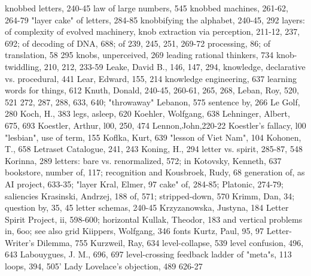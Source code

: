knobbed letters, 240-45                         law of large numbers, 545
knobbed machines, 261-62, 264-79                "layer cake" of letters, 284-85
knobbifying the alphabet, 240-45, 292           layers: of complexity of evolved machinery,
knob extraction via perception, 211-12, 237,      692; of decoding of DNA, 688; of
 239, 245, 251, 269-72                            processing, 86; of translation, 58        295
knobs, unperceived, 269                         leading rational thinkers, 734
knob-twiddling, 210, 212, 233-59                Leake, David B., 146, 147, 294,
knowledge, declarative vs. procedural, 441      Lear, Edward, 155, 214
knowledge engineering, 637                      learning words for things, 612
Knuth, Donald, 240-45, 260-61, 265, 268,        Leban, Roy, 520, 521
 272, 287, 288, 633, 640; "throwaway"           Lebanon, 575
 sentence by, 266                               Le Golf, 280
Koch, H., 383                                   legs, asleep, 620
Koehler, Wolfgang, 638                          Lehninger, Albert, 675, 693
Koestler, Arthur, l00, 250, 474                 Lennon,John,220-22
Koestler's fallacy, l00                         "lesbian", use of term, 155
Koflka, Kurt, 639                               "lesson of Viet Nam", 104
Kohonen, T., 658                                Letraset Catalogue, 241, 243
Koning, H., 294                                 letter vs. spirit, 285-87, 548
Korinna, 289                                    letters: bare vs. renormalized, 572; in
Kotovsky, Kenneth, 637                            bookstore, number of, 117; recognition and
Kousbroek, Rudy, 68                               generation of, as AI project, 633-35; "layer
Kral, Elmer, 97                                   cake" of, 284-85; Platonic, 274-79; saliencies
Krasinski, Andrzej, 188                           of, 571; stripped-down, 570
Krimm, Dan, 34; question by, 35, 45             letter schemas, 240-45
Krzyzanowska, Justyna, 184                      Letter Spirit Project, ii, 598-600; horizontal
Kullak, Theodor, 183                              and vertical problems in, 6oo; see also grid
Kiippers, Wolfgang, 346                           fonts
Kurtz, Paul, 95, 97                             Letter-Writer's Dilemma, 755
Kurzweil, Ray, 634                              level-collapse, 539
                                                level confusion, 496, 643
Labouygues, J. M., 696, 697                     level-crossing feedback
ladder of "meta"s, 113                          loops, 394, 505'
Lady Lovelace's objection, 489                  626-27
